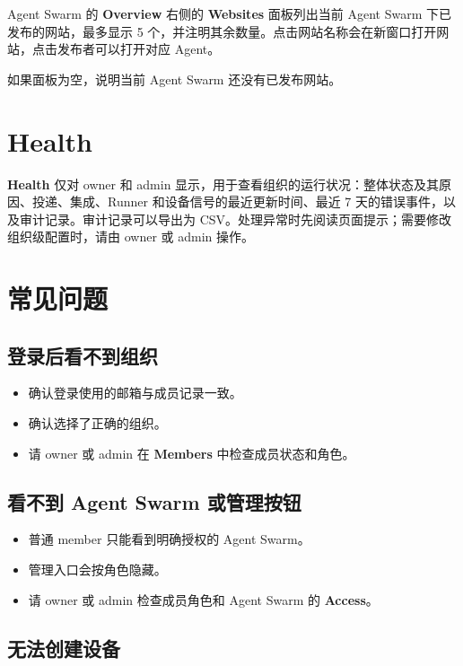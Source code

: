 \documentclass[UTF8,a4paper,11pt]{ctexart}
\begin{document}
Agent Swarm 的 \textbf{Overview} 右侧的 \textbf{Websites} 面板列出当前 Agent Swarm 下已发布的网站，最多显示 5 个，并注明其余数量。点击网站名称会在新窗口打开网站，点击发布者可以打开对应 Agent。

如果面板为空，说明当前 Agent Swarm 还没有已发布网站。

\section{Health}

\textbf{Health} 仅对 owner 和 admin 显示，用于查看组织的运行状况：整体状态及其原因、投递、集成、Runner 和设备信号的最近更新时间、最近 7 天的错误事件，以及审计记录。审计记录可以导出为 CSV。处理异常时先阅读页面提示；需要修改组织级配置时，请由 owner 或 admin 操作。

\section{常见问题}

\subsection{登录后看不到组织}

\begin{itemize}
  \item 确认登录使用的邮箱与成员记录一致。
  \item 确认选择了正确的组织。
  \item 请 owner 或 admin 在 \textbf{Members} 中检查成员状态和角色。
\end{itemize}

\subsection{看不到 Agent Swarm 或管理按钮}

\begin{itemize}
  \item 普通 member 只能看到明确授权的 Agent Swarm。
  \item 管理入口会按角色隐藏。
  \item 请 owner 或 admin 检查成员角色和 Agent Swarm 的 \textbf{Access}。
\end{itemize}

\subsection{无法创建设备}
\end{document}
